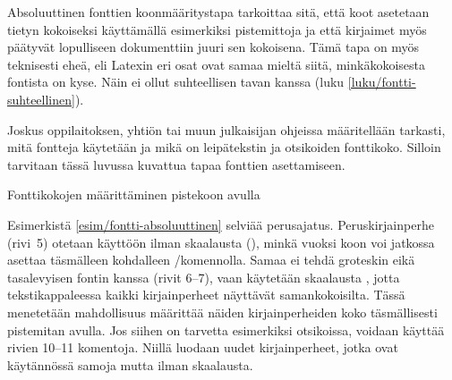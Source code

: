 Absoluuttinen fonttien koonmääritystapa tarkoittaa sitä, että koot
asetetaan tietyn kokoiseksi käyttämällä esimerkiksi pistemittoja ja että
kirjaimet myös päätyvät lopulliseen dokumenttiin juuri sen kokoisena.
Tämä tapa on myös teknisesti eheä, eli Latexin eri osat ovat samaa
mieltä siitä, minkäkokoisesta fontista on kyse. Näin ei ollut
suhteellisen tavan kanssa (luku \ref{luku/fontti-suhteellinen}).

Joskus oppilaitoksen, yhtiön tai muun julkaisijan ohjeissa määritellään
tarkasti, mitä fontteja käytetään ja mikä on leipätekstin ja otsikoiden
fonttikoko. Silloin tarvitaan tässä luvussa kuvattua tapaa fonttien
asettamiseen.

\begin{esimerkki*}

  \caption{Fonttikokojen määrittäminen pistekoon avulla}
  \label{esim/fontti-absoluuttinen}
\end{esimerkki*}

Esimerkistä \ref{esim/fontti-absoluuttinen} selviää perusajatus.
Peruskirjainperhe (rivi~5) otetaan käyttöön ilman skaalausta
(), minkä vuoksi koon voi jatkossa asettaa täsmälleen
kohdalleen \-/komennolla. Samaa ei tehdä groteskin
eikä tasalevyisen fontin kanssa (rivit 6--7), vaan käytetään skaalausta
, jotta tekstikappaleessa kaikki kirjainperheet
näyttävät samankokoisilta. Tässä menetetään mahdollisuus määrittää
näiden kirjainperheiden koko täsmällisesti pistemitan avulla. Jos siihen
on tarvetta esimerkiksi otsikoissa, voidaan käyttää rivien 10--11
komentoja. Niillä luodaan uudet kirjainperheet, jotka ovat käytännössä
samoja mutta ilman skaalausta.

